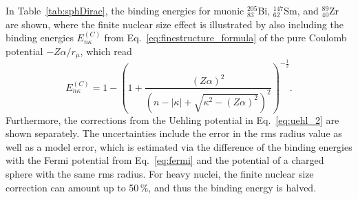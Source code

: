 In Table~\ref{tab:sphDirac}, the binding energies for muonic $^{205}_{83}$Bi, $^{147}_{62}$Sm, and $^{89}_{40}$Zr are shown, where the finite nuclear size effect is illustrated by also including the binding energies $E^{(C)}_{n\kappa}$ from Eq.~\eqref{eq:finestructure_formula} of the pure Coulomb potential $-Z\alpha / r_\mu$, which read~\cite{greiner2000}
\begin{equation}
\label{eq:finestructure_formula_2}
E^{(C)}_{n\kappa}=1-\left(1+\frac{(Z\alpha)^2}{\left( n-|\kappa|+\sqrt{\kappa^2-(Z\alpha)^2} \right)^2}\right)^{-\frac{1}{2}}.
\end{equation}
Furthermore, the corrections from the Uehling potential in Eq.~\eqref{eq:uehl_2} are shown separately. 
The uncertainties include the error in the rms radius value as well as a model error, which is estimated via the difference of the binding energies with the Fermi potential from Eq.~\eqref{eq:fermi} and the potential of a charged sphere with the same rms radius. For heavy nuclei, the finite nuclear size correction can amount up to 50$\,\%$, and thus the binding energy is halved.

